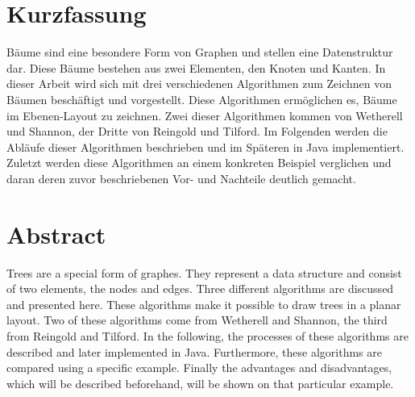 \section*{Kurzfassung}
Bäume sind eine besondere Form von Graphen und stellen eine Datenstruktur dar. Diese Bäume bestehen aus zwei Elementen, 
den Knoten und Kanten. In dieser Arbeit wird sich mit drei verschiedenen Algorithmen zum Zeichnen von Bäumen
beschäftigt und vorgestellt. Diese Algorithmen ermöglichen es, 
Bäume im Ebenen-Layout zu zeichnen. Zwei dieser Algorithmen kommen von Wetherell und Shannon, der Dritte von Reingold und Tilford.
Im Folgenden werden die Abläufe dieser Algorithmen beschrieben und im Späteren in Java implementiert. Zuletzt werden diese Algorithmen 
an einem konkreten Beispiel verglichen und daran deren zuvor beschriebenen Vor- und Nachteile deutlich gemacht.

\vfill\vfill\vfill\vfill\vfill\vfill
\section*{Abstract}
Trees are a special form of graphes. They represent a data structure and consist of two elements,
the nodes and edges. Three different algorithms are discussed and presented here. These algorithms make it possible to
draw trees in a planar layout. Two of these algorithms come from Wetherell and Shannon, the third from Reingold and Tilford.
In the following, the processes of these algorithms are described and later implemented in Java. Furthermore, these algorithms are
compared using a specific example. Finally the advantages and disadvantages, which will be described beforehand, will be shown on that 
particular example.
\vfill\vfill\vfill\vfill\vfill\vfill